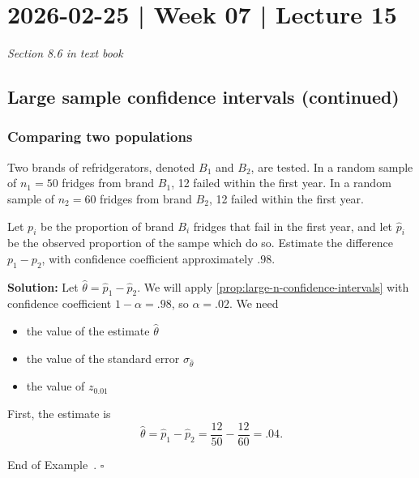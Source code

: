 \documentclass[10pt]{article}
\theoremstyle{definition}
\newtheorem{example}[theorem]{Example}
\renewenvironment{example}
{\begin{oldexample}}
  {\par\smallskip\hfill   End of Example~\theexample. $\square$    \par\end{oldexample}}
\newcommand{\vt}{\vskip 5mm} %
\newcommand{\Fl}{\vt\noindent\textbf} %
\newcommand{\1}[1]{\textbf{1}_{\left[#1\right]}} %
\begin{document}
\newpage

\section{2026-02-25 | Week 07 | Lecture 15}
\textit{Section 8.6 in text book}

\subsection{Large sample confidence intervals (continued)}

\subsubsection{Comparing two populations}
\begin{example}[Example 8.8 in textbook]
  Two brands of refridgerators, denoted $B_{1}$ and $B_{2}$, are tested. In a
  random sample of $n_{1}=50$ fridges from brand $B_{1}$, 12 failed within the
  first year. In a random sample of $n_{2}=60$ fridges from brand $B_{2}$, 12
  failed within the first year.

  Let $p_{i}$ be the proportion of brand $B_{i}$ fridges that fail in the
  first year, and let $\widehat{p}_{i}$ be the observed proportion of the
  sampe which do so. Estimate the difference $p_{1}-p_{2}$, with confidence
  coefficient approximately $.98$.

  \Fl{Solution:} Let $\widehat{\theta} = \widehat{p}_{1}-\widehat{p}_{2}$. We
  will apply \cref{prop:large-n-confidence-intervals} with confidence
  coefficient $1-\alpha=.98$, so $\alpha=.02$. We need
  \begin{itemize}
    \item the value of the estimate $\widehat{\theta}$
    \item the value of the standard error $\sigma_{\widehat{\theta}}$
    \item the value of $z_{0.01}$
  \end{itemize}

  First, the estimate is
  \begin{equation*}
    \widehat{\theta} = \widehat{p}_{1}- \widehat{p}_{2} = \frac{12}{50}- \frac{12}{60} = .04.
  \end{equation*}


\end{example}
\end{document}
